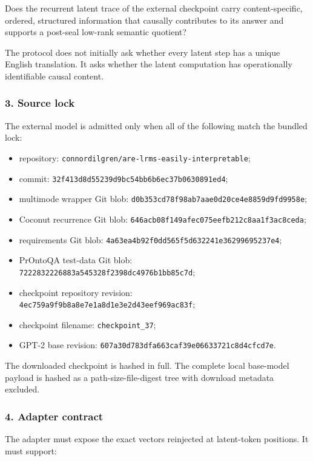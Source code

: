 \documentclass[
  10pt,
]{article}
\providecommand{\tightlist}{%
  \setlength{\itemsep}{0pt}\setlength{\parskip}{0pt}}
\begin{document}
Does the recurrent latent trace of the external checkpoint carry
content-specific, ordered, structured information that causally
contributes to its answer and supports a post-seal low-rank semantic
quotient?

The protocol does not initially ask whether every latent step has a
unique English translation. It asks whether the latent computation has
operationally identifiable causal content.

\subsubsection{3. Source lock}\label{source-lock}

The external model is admitted only when all of the following match the
bundled lock:

\begin{itemize}
\tightlist
\item
  repository: \texttt{connordilgren/are-lrms-easily-interpretable};
\item
  commit: \texttt{32f413d8d55239d9bc54bb6b6ec37b0630891ed4};
\item
  multimode wrapper Git blob:
  \texttt{d0b353cd78f98ab7aae0d20ce4e8859d9fd9958e};
\item
  Coconut recurrence Git blob:
  \texttt{646acb08f149afec075eefb212c8aa1f3ac8ceda};
\item
  requirements Git blob:
  \texttt{4a63ea4b92f0dd565f5d632241e36299695237e4};
\item
  PrOntoQA test-data Git blob:
  \texttt{7222832226883a545328f2398dc4976b1bb85c7d};
\item
  checkpoint repository revision:
  \texttt{4ec759a9f9b8a8e7e1a8d1e3e2d43eef969ac83f};
\item
  checkpoint filename: \texttt{checkpoint\_37};
\item
  GPT-2 base revision:
  \texttt{607a30d783dfa663caf39e06633721c8d4cfcd7e}.
\end{itemize}

The downloaded checkpoint is hashed in full. The complete local
base-model payload is hashed as a path-size-file-digest tree with
download metadata excluded.

\subsubsection{4. Adapter contract}\label{adapter-contract}

The adapter must expose the exact vectors reinjected at latent-token
positions. It must support:
\end{document}
